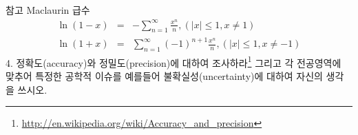 참고 Maclaurin 급수
\begin{eqnarray*}
\ln(1-x)&=&-\sum_{n=1}^{\infty}\frac{x^n}{n}, (|x|\leq 1, x\neq 1)\\
\ln(1+x)&=&\sum_{n=1}^{\infty}(-1)^{n+1}\frac{x^n}{n}, (|x|\leq 1, x\neq -1)
\end{eqnarray*}
4. 정확도(accuracy)와 정밀도(precision)에 대하여 조사하라\footnote{\url{http://en.wikipedia.org/wiki/Accuracy_and_precision}} 그리고 각 전공영역에 맞추어  특정한 공학적 이슈를 예를들어 불확실성(uncertainty)에 대하여 자신의 생각을 쓰시오.
